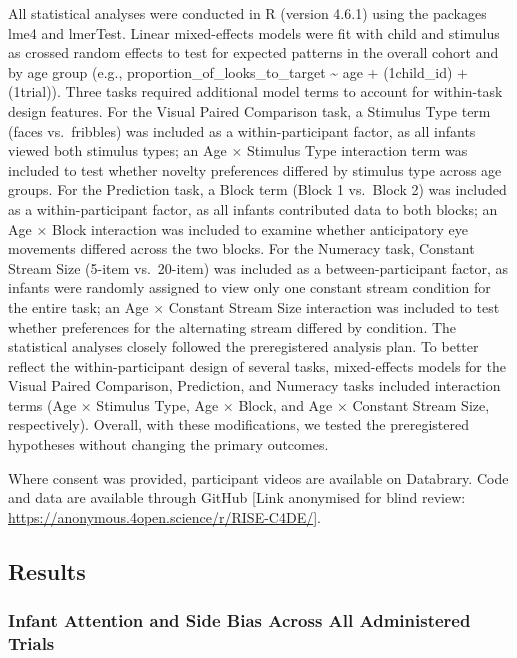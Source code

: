 \documentclass[
  english,
  man,floatsintext]{apa6}
\begin{document}
All statistical analyses were conducted in R (version 4.6.1) using the packages lme4 and lmerTest.
Linear mixed-effects models were fit with child and stimulus as crossed random effects to test for expected patterns in the overall cohort and by age group (e.g., proportion\_of\_looks\_to\_target \textasciitilde{} age + (1\textbar child\_id) + (1\textbar trial)).
Three tasks required additional model terms to account for within-task design features.
For the Visual Paired Comparison task, a Stimulus Type term (faces vs.~fribbles) was included as a within-participant factor, as all infants viewed both stimulus types; an Age × Stimulus Type interaction term was included to test whether novelty preferences differed by stimulus type across age groups.
For the Prediction task, a Block term (Block 1 vs.~Block 2) was included as a within-participant factor, as all infants contributed data to both blocks; an Age × Block interaction was included to examine whether anticipatory eye movements differed across the two blocks.
For the Numeracy task, Constant Stream Size (5-item vs.~20-item) was included as a between-participant factor, as infants were randomly assigned to view only one constant stream condition for the entire task; an Age × Constant Stream Size interaction was included to test whether preferences for the alternating stream differed by condition.
The statistical analyses closely followed the preregistered analysis plan.
To better reflect the within-participant design of several tasks, mixed-effects models for the Visual Paired Comparison, Prediction, and Numeracy tasks included interaction terms (Age × Stimulus Type, Age × Block, and Age × Constant Stream Size, respectively). Overall, with these modifications, we tested the preregistered hypotheses without changing the primary outcomes.

Where consent was provided, participant videos are available on Databrary.
Code and data are available through GitHub {[}Link anonymised for blind review: \url{https://anonymous.4open.science/r/RISE-C4DE/}{]}.

\subsection{Results}\label{results}

\subsubsection{Infant Attention and Side Bias Across All Administered Trials}\label{infant-attention-and-side-bias-across-all-administered-trials}
\end{document}
